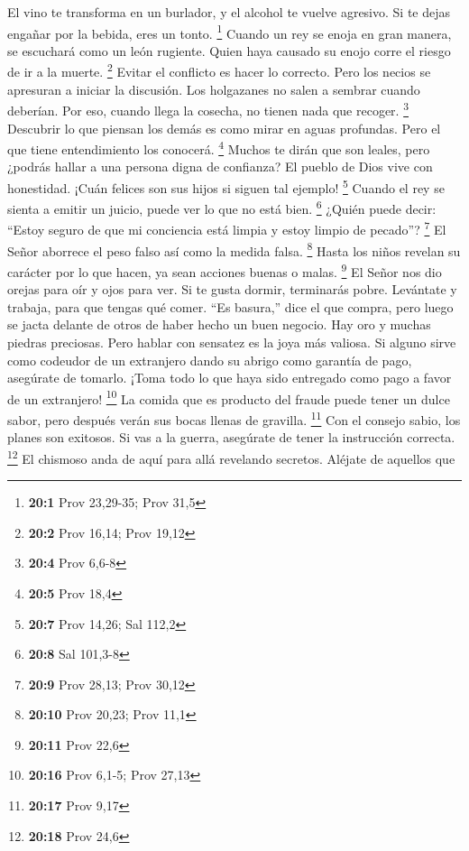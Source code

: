  El vino te transforma en un burlador, y el alcohol te
vuelve agresivo. Si te dejas engañar por la bebida, eres un tonto.
\footnote{\textbf{20:1} Prov 23,29-35; Prov 31,5}  Cuando un
rey se enoja en gran manera, se escuchará como un león rugiente. Quien
haya causado su enojo corre el riesgo de ir a la muerte. \footnote{\textbf{20:2}
  Prov 16,14; Prov 19,12}  Evitar el conflicto es hacer lo
correcto. Pero los necios se apresuran a iniciar la discusión.
 Los holgazanes no salen a sembrar cuando deberían. Por eso,
cuando llega la cosecha, no tienen nada que recoger. \footnote{\textbf{20:4}
  Prov 6,6-8}  Descubrir lo que piensan los demás es como
mirar en aguas profundas. Pero el que tiene entendimiento los conocerá.
\footnote{\textbf{20:5} Prov 18,4}  Muchos te dirán que son
leales, pero ¿podrás hallar a una persona digna de confianza?
 El pueblo de Dios vive con honestidad. ¡Cuán felices son
sus hijos si siguen tal ejemplo! \footnote{\textbf{20:7} Prov 14,26; Sal
  112,2}  Cuando el rey se sienta a emitir un juicio, puede
ver lo que no está bien. \footnote{\textbf{20:8} Sal 101,3-8}
 ¿Quién puede decir: ``Estoy seguro de que mi conciencia
está limpia y estoy limpio de pecado''? \footnote{\textbf{20:9} Prov
  28,13; Prov 30,12}  El Señor aborrece el peso falso así
como la medida falsa. \footnote{\textbf{20:10} Prov 20,23; Prov 11,1}
 Hasta los niños revelan su carácter por lo que hacen, ya
sean acciones buenas o malas. \footnote{\textbf{20:11} Prov 22,6}
 El Señor nos dio orejas para oír y ojos para ver.
 Si te gusta dormir, terminarás pobre. Levántate y trabaja,
para que tengas qué comer.  ``Es basura,'' dice el que
compra, pero luego se jacta delante de otros de haber hecho un buen
negocio.  Hay oro y muchas piedras preciosas. Pero hablar
con sensatez es la joya más valiosa.  Si alguno sirve como
codeudor de un extranjero dando su abrigo como garantía de pago,
asegúrate de tomarlo. ¡Toma todo lo que haya sido entregado como pago a
favor de un extranjero! \footnote{\textbf{20:16} Prov 6,1-5; Prov 27,13}
 La comida que es producto del fraude puede tener un dulce
sabor, pero después verán sus bocas llenas de gravilla. \footnote{\textbf{20:17}
  Prov 9,17}  Con el consejo sabio, los planes son
exitosos. Si vas a la guerra, asegúrate de tener la instrucción
correcta. \footnote{\textbf{20:18} Prov 24,6}  El chismoso
anda de aquí para allá revelando secretos. Aléjate de aquellos que
